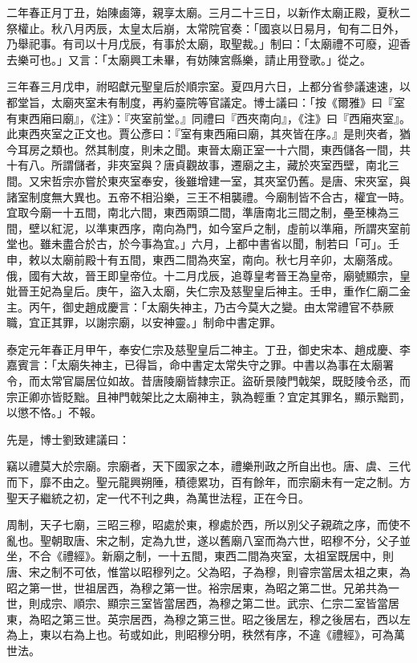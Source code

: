 \begin{pinyinscope}
 二年春正月丁丑，始陳鹵簿，親享太廟。三月二十三日，以新作太廟正殿，夏秋二祭權止。秋八月丙辰，太皇太后崩，太常院官奏：「國哀以日易月，旬有二日外，乃舉祀事。有司以十月戊辰，有事於太廟，取聖裁。」制曰：「太廟禮不可廢，迎香去樂可也。」又言：「太廟興工未畢，有妨陳宮縣樂，請止用登歌。」從之。



 三年春三月戊申，祔昭獻元聖皇后於順宗室。夏四月六日，上都分省參議速速，以都堂旨，太廟夾室未有制度，再約臺院等官議定。博士議曰：「按《爾雅》曰『室有東西廂曰廟』，《注》：『夾室前堂。』同禮曰『西夾南向』，《注》曰『西廂夾室』。此東西夾室之正文也。賈公彥曰：『室有東西廂曰廟，其夾皆在序。』是則夾者，猶今耳房之類也。然其制度，則未之聞。東晉太廟正室一十六間，東西儲各一間，共十有八。所謂儲者，非夾室與？唐貞觀故事，遷廟之主，藏於夾室西壁，南北三間。又宋哲宗亦嘗於東夾室奉安，後雖增建一室，其夾室仍舊。是唐、宋夾室，與諸室制度無大異也。五帝不相沿樂，三王不相襲禮。今廟制皆不合古，權宜一時。宜取今廟一十五間，南北六間，東西兩頭二間，準唐南北三間之制，壘至棟為三間，壁以紅泥，以準東西序，南向為門，如今室戶之制，虛前以準廂，所謂夾室前堂也。雖未盡合於古，於今事為宜。」六月，上都中書省以聞，制若曰「可」。壬申，敕以太廟前殿十有五間，東西二間為夾室，南向。秋七月辛卯，太廟落成。俄，國有大故，晉王即皇帝位。十二月戊辰，追尊皇考晉王為皇帝，廟號顯宗，皇妣晉王妃為皇后。庚午，盜入太廟，失仁宗及慈聖皇后神主。壬申，重作仁廟二金主。丙午，御史趙成慶言：「太廟失神主，乃古今莫大之變。由太常禮官不恭厥職，宜正其罪，以謝宗廟，以安神靈。」制命中書定罪。



 泰定元年春正月甲午，奉安仁宗及慈聖皇后二神主。丁丑，御史宋本、趙成慶、李嘉賓言：「太廟失神主，已得旨，命中書定太常失守之罪。中書以為事在太廟署令，而太常官屬居位如故。昔唐陵廟皆隸宗正。盜斫景陵門戟架，既貶陵令丞，而宗正卿亦皆貶黜。且神門戟架比之太廟神主，孰為輕重？宜定其罪名，顯示黜罰，以懲不恪。」不報。



 先是，博士劉致建議曰：



 竊以禮莫大於宗廟。宗廟者，天下國家之本，禮樂刑政之所自出也。唐、虞、三代而下，靡不由之。聖元龍興朔陲，積德累功，百有餘年，而宗廟未有一定之制。方聖天子繼統之初，定一代不刊之典，為萬世法程，正在今日。



 周制，天子七廟，三昭三穆，昭處於東，穆處於西，所以別父子親疏之序，而使不亂也。聖朝取唐、宋之制，定為九世，遂以舊廟八室而為六世，昭穆不分，父子並坐，不合《禮經》。新廟之制，一十五間，東西二間為夾室，太祖室既居中，則唐、宋之制不可依，惟當以昭穆列之。父為昭，子為穆，則睿宗當居太祖之東，為昭之第一世，世祖居西，為穆之第一世。裕宗居東，為昭之第二世。兄弟共為一世，則成宗、順宗、顯宗三室皆當居西，為穆之第二世。武宗、仁宗二室皆當居東，為昭之第三世。英宗居西，為穆之第三世。昭之後居左，穆之後居右，西以左為上，東以右為上也。茍或如此，則昭穆分明，秩然有序，不違《禮經》，可為萬世法。




\end{pinyinscope}
